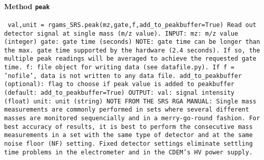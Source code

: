 \paragraph{Method \texttt{peak}}
\vspace{1ex}
\texttt{\newline
val,unit = rgams_SRS.peak(mz,gate,f,add_to_peakbuffer=True)\newline
\newline
Read out detector signal at single mass (m/z value).\newline
\newline
INPUT:\newline
mz: m/z value (integer)\newline
gate: gate time (seconds) NOTE: gate time can be longer than the max. gate time supported by the hardware (2.4 seconds). If so, the multiple peak readings will be averaged to achieve the requested gate time.\newline
f: file object for writing data (see datafile.py). If f = 'nofile', data is not written to any data file.\newline
add_to_peakbuffer (optional): flag to choose if peak value is added to peakbuffer (default: add_to_peakbuffer=True)\newline
\newline
OUTPUT:\newline
val: signal intensity (float)\newline
unit: unit (string)\newline
\newline
NOTE FROM THE SRS RGA MANUAL:\newline
Single mass measurements are commonly performed in sets\newline
where several different masses are monitored sequencially\newline
and in a merry-go-round fashion.\newline
For best accuracy of results, it is best to perform the consecutive\newline
mass measurements in a set with the same type of detector\newline
and at the same noise floor (NF) setting.\newline
Fixed detector settings eliminate settling time problems\newline
in the electrometer and in the CDEM's HV power supply.\newline
\newline
}

